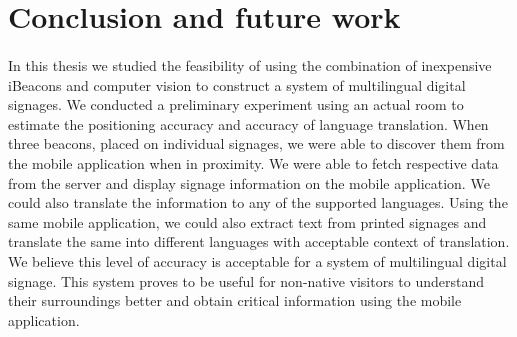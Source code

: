 \documentclass[12pt]{article}
\begin{document}
%
%
%
%
%




\section{ Conclusion and future work}
\label{sect-conclusion}
\paragraph{}In this thesis we studied the feasibility of using the combination of inexpensive iBeacons and computer vision to construct a system of multilingual digital signages. We conducted a preliminary experiment using an actual room to estimate the positioning accuracy and accuracy of language translation. When three beacons, placed on individual signages, we were able to discover them from the mobile application when in proximity. We were able to fetch respective data from the server and display signage information on the mobile application. We could also translate the information to any of the supported languages. Using the same mobile application, we could also extract text from printed signages and translate the same into different languages with acceptable context of translation. We believe this level of accuracy is acceptable for a system of multilingual digital signage. This system proves to be useful for non-native visitors to understand their surroundings better and obtain critical information using the mobile application. 

%
\end{document}
